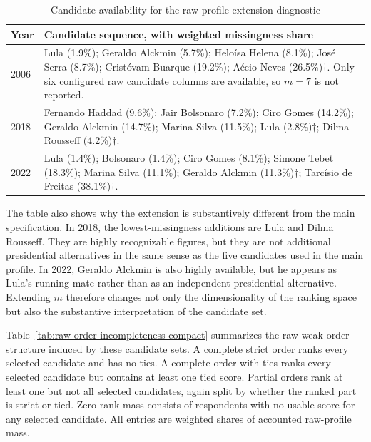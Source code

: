 \documentclass[12pt]{article}
\begin{document}
\begin{table}[htbp]
\centering
\footnotesize
\caption{Candidate availability for the raw-profile extension diagnostic}
\label{tab:raw-candidate-extension-compact}
\begin{tabularx}{\textwidth}{lX}
\toprule
Year & Candidate sequence, with weighted missingness share \\
\midrule
2006 &
Lula (1.9\%);
Geraldo Alckmin (5.7\%);
Heloísa Helena (8.1\%);
José Serra (8.7\%);
Cristóvam Buarque (19.2\%);
Aécio Neves (26.5\%)\(\dagger\).
Only six configured raw candidate columns are available, so \(m=7\) is not
reported. \\
2018 &
Fernando Haddad (9.6\%);
Jair Bolsonaro (7.2\%);
Ciro Gomes (14.2\%);
Geraldo Alckmin (14.7\%);
Marina Silva (11.5\%);
Lula (2.8\%)\(\dagger\);
Dilma Rousseff (4.2\%)\(\dagger\). \\
2022 &
Lula (1.4\%);
Bolsonaro (1.4\%);
Ciro Gomes (8.1\%);
Simone Tebet (18.3\%);
Marina Silva (11.1\%);
Geraldo Alckmin (11.3\%)\(\dagger\);
Tarcísio de Freitas (38.1\%)\(\dagger\). \\
\bottomrule
\end{tabularx}
\end{table}

The table also shows why the extension is substantively different from the
main specification. In 2018, the lowest-missingness additions are Lula and
Dilma Rousseff. They are highly recognizable figures, but they are not
additional presidential alternatives in the same sense as the five candidates
used in the main profile. In 2022, Geraldo Alckmin is also highly available,
but he appears as Lula's running mate rather than as an independent presidential
alternative. Extending \(m\) therefore changes not only the dimensionality of
the ranking space but also the substantive interpretation of the candidate set.

Table~\ref{tab:raw-order-incompleteness-compact} summarizes the raw weak-order
structure induced by these candidate sets. A complete strict order ranks every
selected candidate and has no ties. A complete order with ties ranks every
selected candidate but contains at least one tied score. Partial orders rank at
least one but not all selected candidates, again split by whether the ranked
part is strict or tied. Zero-rank mass consists of respondents with no usable
score for any selected candidate. All entries are weighted shares of accounted
raw-profile mass.
\end{document}
